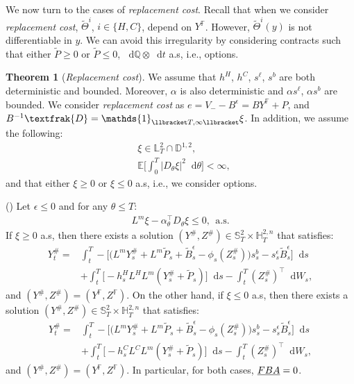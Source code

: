 \documentclass[a4paper, 11pt]{article}              %
\numberwithin{equation}{section}
\theoremstyle{plain}
\newcommand{\1}{\mathds{1}}
\newcommand{\frD}{\textfrak{D}}
\newcommand{\Bt}{\tilde{B}}
\newcommand{\pt}{\tilde{P}}
\newcommand{\dsE}{\mathbb{E}}
\newcommand{\dsF}{\mathbb{F}}
\newcommand{\dsH}{\mathbb{H}}
\newcommand{\dsQ}{\mathbb{Q}}
\newcommand{\dsL}{\mathbb{L}}
\newcommand{\dsS}{\mathbb{S}}
\newcommand{\dsD}{\mathbb{D}}
\newcommand{\Jt}{\tilde{\Theta}}
\theoremstyle{plain}
\newtheorem{theorem}[thm]{Theorem}
\theoremstyle{definition}
\newtheorem{theorem}{Theorem}
\theoremstyle{plain}
\newcommand*\df{\mathop{}\!\mathrm{d}}
\newcommand{\rom}[1]{\lowercase\expandafter{\romannumeral #1\relax}}
\begin{document}
We now turn to the cases of \textit{replacement cost}. Recall that when we
consider \textit{replacement cost}, $\Jt^{ i}$, $i \in \{H, C\}$, depend on
$Y^\dsF$. However, $\Jt^{i}(y)$ is not differentiable in $y$. We can avoid
this irregularity by considering contracts such that either $\pt \geq0$ or
$\pt \leq0$, $\df \dsQ \otimes \df t$ a.s, i.e., options.
\begin{theorem}[\textit{Replacement cost}] \label{thm:replacement} We
  assume that $h^H$, $h^C$, $s^\ell$, $s^b$ are both deterministic and bounded.  Moreover,
  $\alpha$ is also deterministic and $\alpha s^\ell$, $\alpha s^b$ are bounded. We consider
  \textit{replacement cost} as $e = V_- -B^\epsilon = B Y^\dsF + P$, and
  $B^{-1}\frD = \1_{\llbracket T, \infty\llbracket}\xi$. In addition, we assume the following:
\begin{eqnarray}
  & \xi \in\dsL_T^2\cap \dsD^{1, 2}, \label{thm2:int1}\\%
  &\dsE\bigg[\int_{0}^{T}\big|D_\theta \xi\big|^2\df \theta\bigg] <\infty, \label{thm2:int2}
\end{eqnarray}
and that either $\xi \geq0$ or $\xi \leq0$ a.s, i.e., we consider options.

(\rom{1}) Let  $\epsilon \leq0$ and for any $\theta \leq T$:
\begin{align}
  L^m\xi - \alpha_\theta^\top D_\theta\xi \leq0, ~~\text{a.s.} \label{thm2:condition}
\end{align}
If $ \xi \geq0 $ a.s, then there exists a solution
$(Y^\#, Z^\#)\in \dsS^2_T \times \dsH^{2, n}_T$ that satisfies:
\begin{align}
  Y^\#_t =& \int_{t}^{T} -\bigg[\Big(L^mY^\#_s +L^m\pt_s+\Bt^\epsilon_s-\phi_s(Z^\#_s)\Big)s^{b}_s-s^\epsilon_s\Bt^\epsilon_s\bigg]\df s\nonumber\\
  &+\int_{t}^{T}
    \big[-h^H_sL^HL^m(Y^\#_s+\pt_s)\big]\df s
    -\int_{t}^{T}(Z^\#_s)^\top\df W_s, \nonumber 
\end{align}
and $(Y^\#, Z^\#)=(Y^\dsF, Z^\dsF)$. On the other hand, if $\xi \leq0 $ a.s, then
there exists a solution $(Y^\#, Z^\#)\in \dsS^2_T \times \dsH^{2, n}_T$ that satisfies:
\begin{align}
  Y^\#_t =& \int_{t}^{T} -\bigg[\Big(L^mY^\#_s +L^m\pt_s+\Bt^\epsilon_s-\phi_s(Z^\#_s)\Big)s^{b}_s-s^\epsilon_s\Bt^\epsilon_s\bigg]\df s\nonumber\\
          &+\int_{t}^{T}
            \big[-h^C_sL^CL^m(Y^\#_s+\pt_s)
            \big]\df s
            -\int_{t}^{T}(Z^\#_s)^\top\df W_s, \nonumber 
\end{align}
and $(Y^\#, Z^\#)=(Y^\dsF, Z^\dsF)$. In particular, for both cases, $\emph{FBA}=0$. 


\end{theorem}
\end{document}
